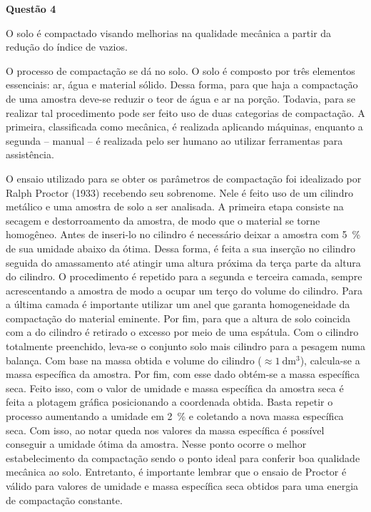 \item[]\textbf{Questão 4}

\hspace{1cm} O solo é compactado visando melhorias na qualidade mecânica a partir da redução do índice de vazios.

\hspace{1cm} O processo de compactação se dá no solo. O solo é composto por três elementos essenciais: ar, água e material sólido. Dessa forma, para que haja a compactação de uma amostra deve-se reduzir o teor de água e ar na porção. Todavia, para se realizar tal procedimento pode ser feito uso de duas categorias de compactação. A primeira, classificada como mecânica, é realizada aplicando máquinas, enquanto a segunda -- manual -- é realizada pelo ser humano ao utilizar ferramentas para assistência. 

\hspace{1cm} O ensaio utilizado para se obter os parâmetros de compactação foi idealizado por Ralph Proctor (1933) recebendo seu sobrenome. Nele é feito uso de um cilindro metálico e uma amostra de solo a ser analisada. A primeira etapa consiste na secagem e destorroamento da amostra, de modo que o material se torne homogêneo. Antes de inseri-lo no cilindro é necessário deixar a amostra com \SI{5}{\%} de sua umidade abaixo da ótima. Dessa forma, é feita a sua inserção no cilindro seguida do amassamento até atingir uma altura próxima da terça parte da altura do cilindro. O procedimento é repetido para a segunda e terceira camada, sempre acrescentando a amostra de modo a ocupar um terço do volume do cilindro. Para a última camada é importante utilizar um anel que garanta homogeneidade da compactação do material eminente. Por fim, para que a altura de solo coincida com a do cilindro é retirado o excesso por meio de uma espátula. Com o cilindro totalmente preenchido, leva-se o conjunto solo mais cilindro para a pesagem numa balança. Com base na massa obtida e volume do cilindro ($\approx\SI{1}{\deci\meter^{3}}$), calcula-se a massa específica da amostra. Por fim, com esse dado obtém-se a massa específica seca. Feito isso, com o valor de umidade e massa específica da amostra seca é feita a plotagem gráfica posicionando a coordenada obtida. Basta repetir o processo aumentando a umidade em \SI{2}{\%} e coletando a nova massa específica seca. Com isso, ao notar queda nos valores da massa específica é possível conseguir a umidade ótima da amostra. Nesse ponto ocorre o melhor estabelecimento da compactação sendo o ponto ideal para conferir boa qualidade mecânica ao solo. Entretanto, é importante lembrar que o ensaio de Proctor é válido para valores de umidade e massa específica seca obtidos para uma energia de compactação constante.